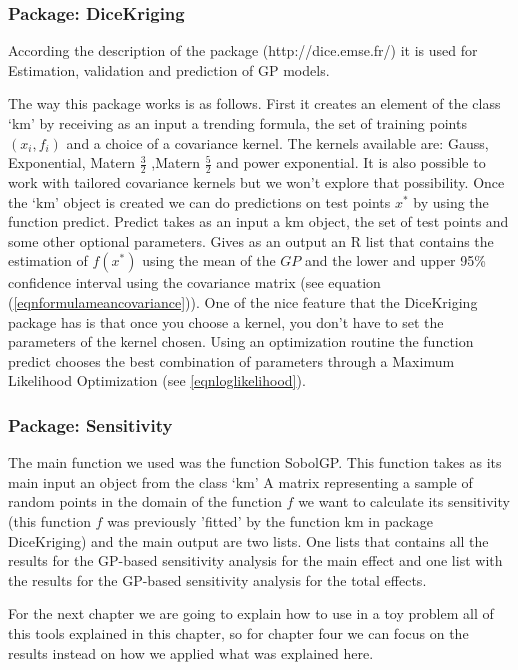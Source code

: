 \documentclass[12pt]{book}
\begin{document}
\subsubsection{Package: DiceKriging}
According the description of the package (http://dice.emse.fr/) it is used for Estimation, validation and 
prediction of GP models.

The way this package works is as follows. First it creates an element of the class `km' by receiving 
as an input a trending formula, the set of training points $(x_{i},f_{i})$ and a choice 
of a covariance kernel. The kernels available are: Gauss, Exponential, Matern $\frac{3}{2}$
,Matern $\frac{5}{2}$ and power exponential. It is also possible to work with tailored covariance
kernels but we won't explore that possibility. Once the `km' object is created we can do 
predictions on test points $x^{*}$ 
by using the function predict. Predict takes as an input a km object, the set of test points and 
some other optional parameters. Gives as an output an R list that contains the estimation of $f(x^{*})$
using the mean of the $GP$ and the lower and upper 95\% confidence interval using the 
covariance matrix (see equation (\ref{eqnformulameancovariance})).
One of the nice feature that the DiceKriging package has is that once you choose a kernel, you don't
have to set the parameters of the kernel chosen. Using an optimization routine the function
predict chooses the best combination
of parameters through a Maximum Likelihood Optimization \cite{dupuy2015dicedesign} (see \ref{eqnloglikelihood}).


\subsubsection{Package: Sensitivity}
The main function we used was the function SobolGP. This function takes as its main   input an object 
from the class `km' A matrix representing a sample of random points in the domain of the function $f$
we want to calculate its sensitivity (this function $f$ was previously 'fitted' by the function
km in package DiceKriging) and the main output are two lists. One lists that contains 
all the results for the GP-based sensitivity analysis for the main effect and one list with the 
results for the GP-based sensitivity analysis for the total effects.

 

For the next chapter we are going to explain how to use in a toy problem all of this tools explained in this 
chapter, so for chapter four we can focus on the results instead on how we applied what was explained here. 








\end{document}

